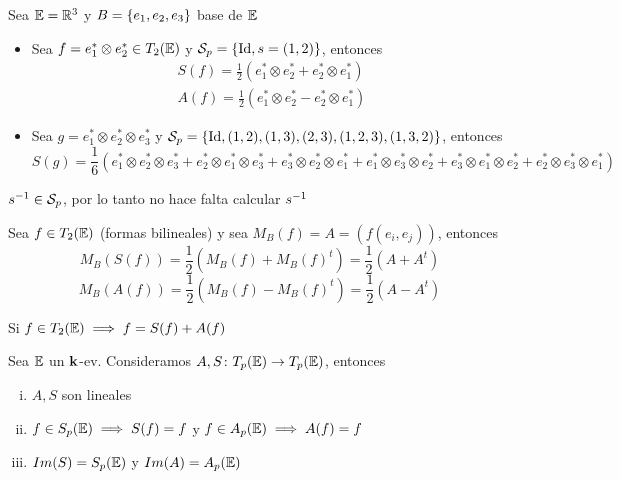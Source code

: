 \begin{example}
    Sea $\mathbb{E} = \mathbb{R}^3$ y $B = \left\{e_1,e_2,e_3\right\}$ base de $\mathbb{E}$
    \begin{itemize}
        \item Sea $f = e_1^* \otimes e_2^* \in T_2(\mathbb{E})$ y $\mathcal{S}_p=\left\{\operatorname{Id},s=(1,2)\right\}$,
        entonces
        \begin{gather*}
            S(f) = \frac{1}{2} (e_1^* \otimes e_2^* + e_2^* \otimes e_1^*) \\
            A(f) = \frac{1}{2} (e_1^* \otimes e_2^* - e_2^* \otimes e_1^*)
        \end{gather*}
        \item Sea $g = e_1^* \otimes e_2^* \otimes e_3^*$ y $\mathcal{S}_p =
        \left\{\operatorname{Id},(1,2),(1,3),(2,3),(1,2,3),(1,3,2)\right\}$, entonces
        \[
            S(g) = \frac{1}{6} (e_1^*\otimes e_2^*\otimes e_3^* + e_2^*\otimes e_1^*\otimes e_3^* +
            e_3^*\otimes e_2^*\otimes e_1^* + e_1^*\otimes e_3^*\otimes e_2^* +
            e_3^*\otimes e_1^*\otimes e_2^* + e_2^*\otimes e_3^*\otimes e_1^*)
        \]
    \end{itemize}
\end{example}
\begin{obs}
    $s^{-1} \in \mathcal{S}_p$, por lo tanto no hace falta calcular $s^{-1}$
\end{obs}
\begin{example}
    Sea $f \in T_2(\mathbb{E})$ (formas bilineales) y sea $M_B(f)=A= \left( f(e_i,e_j) \right)$, entonces
    \[
        M_B(S(f)) = \frac{1}{2}\left( M_B(f) + M_B(f)^t \right) = \frac{1}{2}(A + A^t)
    \]
    \[
        M_B(A(f)) = \frac{1}{2}\left( M_B(f) - M_B(f)^t \right) = \frac{1}{2}(A - A^t)
    \]
\end{example}
\begin{obs}
    Si $f \in T_2(\mathbb{E}) \implies f = S(f) + A(f)$ 
\end{obs}
\begin{prop}
    Sea $\mathbb{E}$ un $\mathbf{k}$-ev. Consideramos $A,S \colon T_p(\mathbb{E}) \to T_p(\mathbb{E})$, entonces
    \begin{enumerate}[i)]
        \item $A,S$ son lineales
        \item\label{item:s_sp} $f \in S_p(\mathbb{E}) \implies S(f) = f$ y $f \in A_p(\mathbb{E}) \implies A(f) = f$
        \item $Im(S)=S_p(\mathbb{E})$ y $Im(A)=A_p(\mathbb{E})$
    \end{enumerate}
\end{prop}
